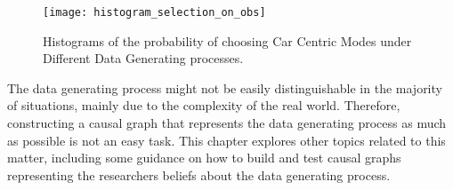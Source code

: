 \begin{figure}
   \centering
   \texttt{[image: histogram\_selection\_on\_obs]}
   \caption{Histograms of the probability of choosing Car Centric Modes under Different Data Generating processes.}
   \label{fig:histogram_probability}
\end{figure}

The data generating process might not be easily distinguishable in the majority of situations, mainly due to the complexity of the real world.
Therefore, constructing a causal graph that represents the data generating process as much as possible is not an easy task.
This chapter explores other topics related to this matter, including some guidance on how to build and test causal graphs representing the researchers beliefs about the data generating process.

